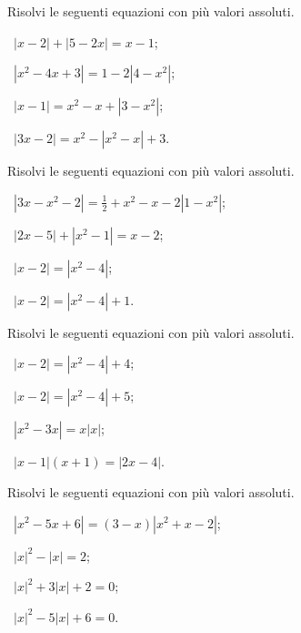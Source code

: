 \begin{esercizio}[\Ast]
 \label{ese:7.17}
Risolvi le seguenti equazioni con più valori assoluti.
\begin{multicols}{2}
 \begin{enumeratea}
 \item~$\left|x-2\right|+\left|5-2x\right|=x-1$;
 \item~$\left|x^2-4x+3\right|=1-2\left|4-x^2\right|$;
 \item~$\left|x-1\right|=x^2-x+\left|3-x^2\right|$;
 \item~$\left|3x-2\right|=x^2-\left|x^2-x\right|+3$.
 \end{enumeratea}
 \end{multicols}
\end{esercizio}

\begin{esercizio}[\Ast]
 \label{ese:7.18}
Risolvi le seguenti equazioni con più valori assoluti.
\begin{multicols}{2}
 \begin{enumeratea}
 \item~$\left|3x-x^2-2\right|=\frac 1 2+x^2-x-2\left|1-x^2\right|$;
 \item~$\left|2x-5\right|+\left|x^2-1\right|=x-2$;
 \item~$\left|x-2\right|=\left|x^2-4\right|$;
 \item~$\left|x-2\right|=\left|x^2-4\right|+1$.
 \end{enumeratea}
 \end{multicols}
\end{esercizio}

\begin{esercizio}[\Ast]
 \label{ese:7.19}
Risolvi le seguenti equazioni con più valori assoluti.
\begin{multicols}{2}
 \begin{enumeratea}
 \item~$\left|x-2\right|=\left|x^2-4\right|+4$;
 \item~$\left|x-2\right|=\left|x^2-4\right|+5$;
 \item~$\left|x^2-3x\right|=x\left|x\right|$;
 \item~$\left|x-1\right|(x+1)=\left|2x-4\right|$.
 \end{enumeratea}
 \end{multicols}
\end{esercizio}

\begin{esercizio}[\Ast]
 \label{ese:7.20}
Risolvi le seguenti equazioni con più valori assoluti.
\begin{multicols}{2}
 \begin{enumeratea}
 \item~$\left|x^2-5x+6\right|=(3-x)\left|x^2+x-2\right|$;
 \item~$\left|x\right|^2-\left|x\right|=2$;
 \item~$\left|x\right|^2+3\left|x\right|+2=0$;
 \item~$\left|x\right|^2-5\left|x\right|+6=0$.
 \end{enumeratea}
 \end{multicols}
\end{esercizio}

